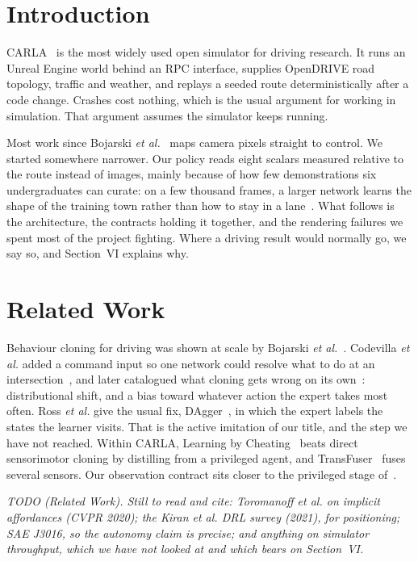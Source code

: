 \documentclass[conference]{IEEEtran}
\newcommand{\TODO}[1]{%
  \begingroup
  \setlength{\FrameSep}{4pt}%
  \def\FrameCommand{{\color{gray!55}\vrule width 1.2pt}\hspace{5pt}}%
  \MakeFramed{\advance\hsize-\width \FrameRestore}%
  \noindent\scriptsize\itshape\color{gray!80}#1%
  \endMakeFramed
  \endgroup}
\begin{document}
\section{Introduction}

CARLA~\cite{carla} is the most widely used open simulator for driving
research. It runs an Unreal Engine world behind an RPC interface,
supplies OpenDRIVE road topology, traffic and weather, and replays a
seeded route deterministically after a code change. Crashes cost
nothing, which is the usual argument for working in simulation. That
argument assumes the simulator keeps running.

Most work since Bojarski \textit{et al.}~\cite{bojarski} maps camera
pixels straight to control. We started somewhere narrower. Our policy
reads eight scalars measured relative to the route instead of images,
mainly because of how few demonstrations six undergraduates can curate:
on a few thousand frames, a larger network learns the shape of the
training town rather than how to stay in a lane~\cite{limits}. What
follows is the architecture, the contracts holding it together, and the
rendering failures we spent most of the project fighting. Where a
driving result would normally go, we say so, and Section~VI explains
why.

\section{Related Work}

Behaviour cloning for driving was shown at scale by Bojarski \textit{et
al.}~\cite{bojarski}. Codevilla \textit{et al.} added a command input so
one network could resolve what to do at an intersection~\cite{cil}, and
later catalogued what cloning gets wrong on its own~\cite{limits}:
distributional shift, and a bias toward whatever action the expert takes
most often. Ross \textit{et al.} give the usual fix,
DAgger~\cite{dagger}, in which the expert labels the states the learner
visits. That is the active imitation of our title, and the step we have
not reached. Within CARLA, Learning by Cheating~\cite{lbc} beats direct
sensorimotor cloning by distilling from a privileged agent, and
TransFuser~\cite{transfuser} fuses several sensors. Our observation
contract sits closer to the privileged stage of~\cite{lbc}.

\TODO{TODO (Related Work). Still to read and cite: Toromanoff
\textit{et al.} on implicit affordances (CVPR 2020); the Kiran
\textit{et al.} DRL survey (2021), for positioning; SAE J3016, so the
autonomy claim is precise; and anything on simulator throughput, which
we have not looked at and which bears on Section~VI.}
\end{document}
